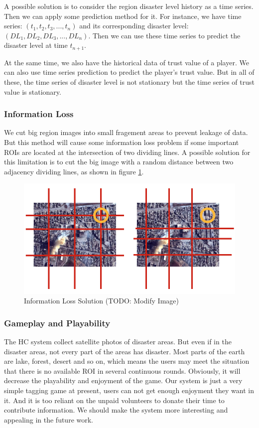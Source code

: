 A possible solution is to consider the region disaster level history as a time series. Then we can apply
some prediction method for it. For instance, we have time series: $(t_1, t_2, t_3, ..., t_n)$
and its corresponding disaster level: $(DL_1, DL_2, DL_3, ..., DL_n)$.
Then we can use these time series to predict the disaster level at time $t_{n+1}$.

At the same time, we also have the historical data of trust value of a player. We can also
use time series prediction to predict the player's trust value. But in all of these, the time series
of disaster level is not stationary but the time series of trust value is stationary.

\subsubsection{Information Loss}
We cut big region images into small fragement areas to prevent leakage of data. 
But this method will cause some information loss problem if some important ROIs are 
located at the intersection of two dividing lines.
A possible solution for this limitation is to cut the big image with a random distance 
between two adjacency dividing lines, as shown in figure \ref{fig:information_loss}.

\begin{figure}[htp]
\centering
\includegraphics[width=0.5\columnwidth]{figures/information_loss}
\caption{Information Loss Solution (TODO: Modify Image)}
\label{fig:information_loss}
\end{figure}

\subsubsection{Gameplay and Playability}

The HC system collect satellite photos of disaster areas. But even if in the disaster areas, 
not every part of the areas has disaster. Most parts of the earth are lake, forest, 
desert and so on, which means the users may meet the situation that there is no available 
ROI in several continuous rounds. Obviously, it will decrease the playability and enjoyment of the game.
Our system is just a very simple tagging game at present, users can not get enough enjoyment they want in it. 
And it is too reliant on the unpaid volunteers to donate their time to contribute information. 
We should make the system more interesting and appealing in the future work.
